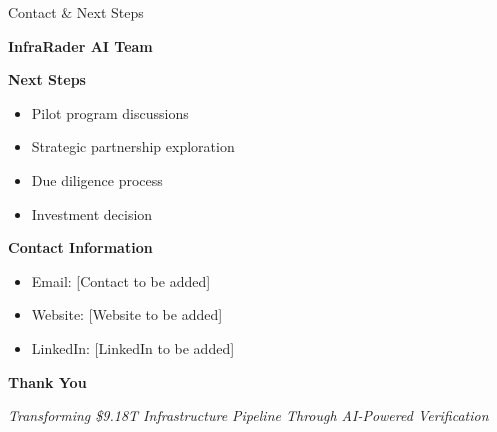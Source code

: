 \documentclass[aspectratio=169]{beamer}
\newcommand{\InfraRaderAI}{\textcolor{InfraRaderBlue}{InfraRader AI}}
\begin{document}
\begin{frame}{Contact \& Next Steps}
    \begin{center}
        \textbf{\InfraRaderAI{} Team}
        
        \vspace{1cm}
        \textbf{Next Steps}
        \begin{itemize}
            \item Pilot program discussions
            \item Strategic partnership exploration
            \item Due diligence process
            \item Investment decision
        \end{itemize}
        
        \vspace{1cm}
        \textbf{Contact Information}
        \begin{itemize}
            \item Email: [Contact to be added]
            \item Website: [Website to be added]
            \item LinkedIn: [LinkedIn to be added]
        \end{itemize}
        
        \vspace{1cm}
        \textbf{Thank You}
        
        \vspace{0.5cm}
        \textit{Transforming \$9.18T Infrastructure Pipeline Through AI-Powered Verification}
    \end{center}
\end{frame}
\end{document}

